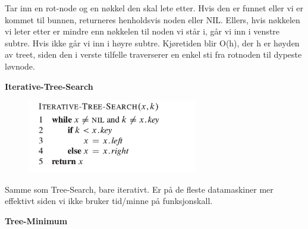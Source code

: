 \documentclass[12pt]{report}
\begin{document}

\par


\vspace{\baselineskip}
Tar inn en rot-node og en nøkkel den skal lete etter. Hvis den er funnet eller vi er kommet til bunnen, returneres henholdsvis noden eller NIL. Ellers, hvis nøkkelen vi leter etter er mindre enn nøkkelen til noden vi står i, går vi inn i venstre subtre. Hvis ikke går vi inn i høyre subtre. Kjøretiden blir O(h), der h er høyden av treet, siden den i verste tilfelle traverserer en enkel sti fra rotnoden til dypeste løvnode. \par


\vspace{\baselineskip}

\vspace{\baselineskip}
{\fontsize{14pt}{16.8pt}\selectfont \textbf{Iterative-Tree-Search}\par}\par




\begin{figure}[H]
	\begin{Center}
		\includegraphics[width=2.93in,height=1.26in]{./media/image79.png}
	\end{Center}
\end{figure}



\par

Samme som Tree-Search, bare iterativt. Er på de fleste datamaskiner mer effektivt siden vi ikke bruker tid/minne på funksjonskall. \par


\vspace{\baselineskip}
{\fontsize{14pt}{16.8pt}\selectfont \textbf{Tree-Minimum}\par}\par
\end{document}
